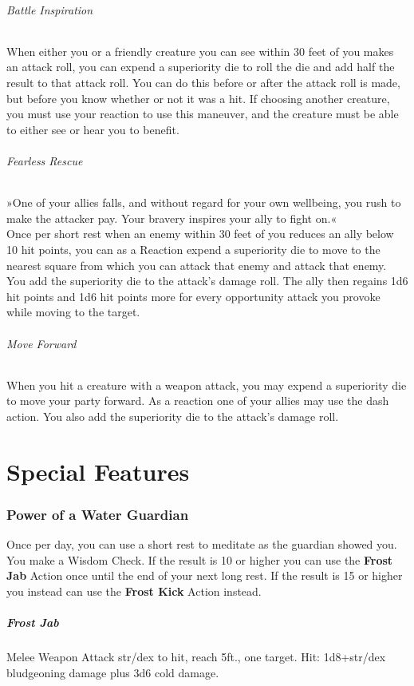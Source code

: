 \documentclass[letter,10pt,twocolumn,openany]{dndbook}
\begin{document}
\subparagraph{Battle Inspiration}
When either you or a friendly creature you can see within 30 feet of you makes an attack roll, you can expend a superiority die to roll the die and add half the result to that attack roll. You can do this before or after the attack roll is made, but before you know whether or not it was a hit. If choosing another creature, you must use your reaction to use this maneuver, and the creature must be able to either see or hear you to benefit.

\subparagraph{Fearless Rescue}
»One of your allies falls, and without regard for your own wellbeing, you rush to make the attacker pay. Your bravery inspires your ally to fight on.«\\
Once per short rest when an enemy within 30 feet of you reduces an ally below 10 hit points, you can as a Reaction expend a superiority die to move to the nearest square from which you can attack that enemy and attack that enemy. You add the superiority die to the attack's damage roll.
The ally then regains 1d6 hit points and 1d6 hit points more for every opportunity attack you provoke while moving to the target.

\subparagraph{Move Forward}
When you hit a creature with a weapon attack, you may expend a superiority die to move your party forward.
As a reaction one of your allies may use the dash action.
You also add the superiority die to the attack's damage roll.

\chapter{Special Features}

\subsection{Power of a Water Guardian}

Once per day, you can use a short rest to meditate as the guardian showed you. You make a Wisdom Check. If the result is 10 or higher you can use the \textbf{Frost Jab} Action once until the end of your next long rest. If the result is 15 or higher you instead can use the \textbf{Frost Kick} Action instead.

\paragraph{Frost Jab} Melee Weapon Attack str/dex to hit, reach 5ft., one target. Hit: 1d8+str/dex bludgeoning damage plus 3d6 cold damage.
\end{document}
